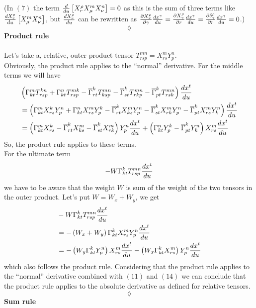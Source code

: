 (In $(7)$ the term $ \dv{}{u}\left[X^{\rho}_{r}X^{m}_{\mu}X^{n}_{\nu}\right]=0$ as this is the sum of three terms like $\dv{X^{\rho}_{r}}{u}\left[X^{m}_{\mu}X^{n}_{\nu}\right]$, but $\dv{X^{\rho}_{r}}{u}$ can be rewritten as  $\pdv{X^{\rho}_{r}}{\gamma}\dv{x^{\gamma}}{u}= \pdv{X^{\rho}_{\gamma}}{r}\dv{x^{\gamma}}{u}= \pdv{\delta^{\rho}_{\gamma}}{r}\dv{x^{\gamma}}{u} = 0$.)
$$\lozenge$$
\textbf{Product rule}\\\\
Let's take a, relative,  outer product tensor $T^{mn}_{rsp} =X^{m}_{rs}Y^{n}_{p} $.\\
Obviously, the product rule applies to the ``normal'' derivative.
For the middle terms we will have
\begin{align}
&\left(\Gamma^m_{kt}T^{kn}_{rsp}+\Gamma^n_{kt}T^{mk}_{rsp}-\overline{\Gamma}^k_{rt}T^{mn}_{ksp} -\overline{\Gamma}^k_{st}T^{mn}_{rkp} -\overline{\Gamma}^k_{pt}T^{mn}_{rsk} \right)\dv{x^t}{u}\\
&= \left(\Gamma^m_{kt}X^{k}_{rs}Y^{n}_{p}+\Gamma^n_{kt}X^{m}_{rs}Y^{k}_{p}-\overline{\Gamma}^k_{rt}X^{m}_{ks}Y^{n}_{p} -\overline{\Gamma}^k_{st}X^{m}_{rk}Y^{n}_{p} -\overline{\Gamma}^k_{pt}X^{m}_{rs}Y^{n}_{k} \right)\dv{x^t}{u}\\
&= \left(\Gamma^m_{kt}X^{k}_{rs}-\overline{\Gamma}^k_{rt}X^{m}_{ks} -\overline{\Gamma}^k_{st}X^{m}_{rk}  \right)Y^{n}_{p}\dv{x^t}{u}+\left(\Gamma^n_{kt}Y^{k}_{p}  -\overline{\Gamma}^k_{pt}Y^{n}_{k} \right)X^{m}_{rs}\dv{x^t}{u}
\end{align}
So, the product rule applies to these terms.\\
For the ultimate term 
$$-W\Gamma^k_{kt}T^{mn}_{rsp}\dv{x^t}{u}$$ we have to be aware that the weight $W$ is sum of the weight of the two tensors in the outer product. Let's put $W= W_x + W_y$, we get
\begin{align}
&-W\Gamma^k_{kt}T^{mn}_{rsp}\dv{x^t}{u}\\
&= 
-\left(W_x+W_y\right)\Gamma^k_{kt}X^{m}_{rs}Y^{n}_{p}\dv{x^t}{u}\\
&= 
-\left(W_y\Gamma^k_{kt}Y^{n}_{p}\right)X^{m}_{rs}\dv{x^t}{u}-\left(W_x\Gamma^k_{kt}X^{m}_{rs}\right)Y^{n}_{p}\dv{x^t}{u}
\end{align}
which also follows the product rule. 
Considering that the product rule applies to the ``normal'' derivative combined with $(11)$ and $(14)$ we can conclude that the product rule applies to the absolute derivative as defined for relative tensors.
$$\lozenge$$
\textbf{Sum rule}\\\\
